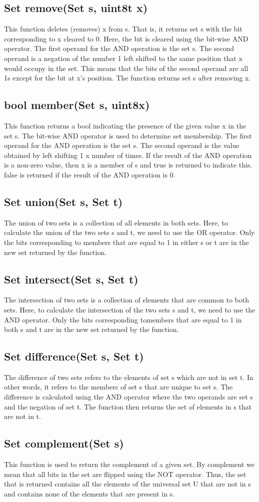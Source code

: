 \documentclass{article}
\begin{document}
\subsection{Set remove(Set s, uint8\textunderscore t x)}
This function deletes (removes) x from s. That is, it returns set s with the bit corresponding to x
cleared to 0. Here, the bit is cleared using the bit-wise AND operator. The first operand for the AND
operation is the set s. The second operand is a negation of the number 1 left shifted to the same position
that x would occupy in the set. This means that the bits of the second operand are all 1s except for the
bit at x’s position. The function returns set s after removing x.
\subsection{bool member(Set s, uint8\textunderscore x)}
This function returns a bool indicating the presence of the given value x in the set s. The bit-wise AND
operator is used to determine set membership. The first operand for the AND operation is the set s.
The second operand is the value obtained by left shifting 1 x number of times. If the result of the AND
operation is a non-zero value, then x is a member of s and true is returned to indicate this. false is
returned if the result of the AND operation is 0.
\subsection{Set union(Set s, Set t)}
The union of two sets is a collection of all elements in both sets. Here, to calculate the union of the two
sets s and t, we need to use the OR operator. Only the bits corresponding to members that are equal to
1 in either s or t are in the new set returned by the function.
\subsection{Set intersect(Set s, Set t)}
The intersection of two sets is a collection of elements that are common to both sets. Here, to calculate
the intersection of the two sets s and t, we need to use the AND operator. Only the bits corresponding
tomembers that are equal to 1 in both s and t are in the new set returned by the function.
\subsection{Set difference(Set s, Set t)}
The difference of two sets refers to the elements of set s which are not in set t. In other words, it refers to
the members of set s that are unique to set s. The difference is calculated using the AND operator where
the two operands are set s and the negation of set t. The function then returns the set of elements in s
that are not in t.
\subsection{Set complement(Set s)}
This function is used to return the complement of a given set. By complement we mean that all bits in
the set are flipped using the NOT operator. Thus, the set that is returned contains all the elements of the
universal set U that are not in s and contains none of the elements that are present in s.
\end{document}
